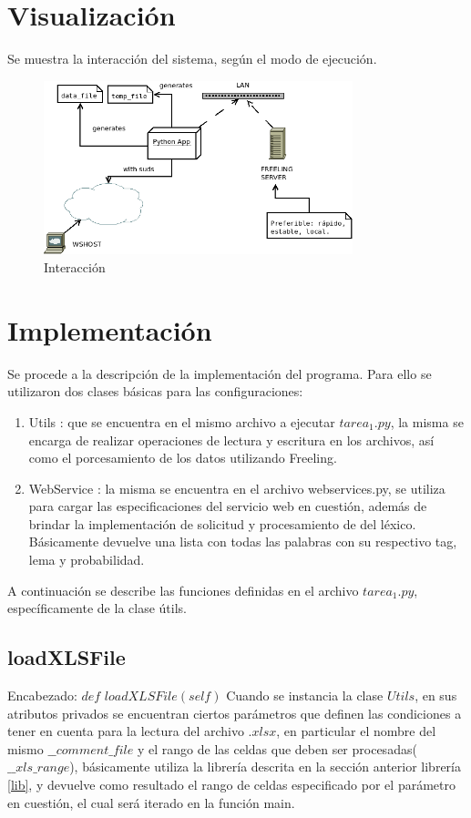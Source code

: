 \documentclass[12pt]{article}
\begin{document}
\section{Visualización}
Se muestra la interacción del sistema, según el modo de ejecución.

\begin{figure}[!h]
  \centering
    \includegraphics[width=0.8\textwidth]{./fig/arq.png}
  \caption{Interacción}
  \label{fig:arq}
\end{figure} 


\section{Implementación} \label{impl}
Se procede a la descripción de la implementación del programa. Para ello se utilizaron dos clases básicas para las configuraciones:
\begin{enumerate}
   \item Utils : que se encuentra en el mismo archivo a ejecutar $tarea_1.py$, la misma se encarga de realizar operaciones de lectura y escritura en los archivos, así como el porcesamiento de los datos utilizando Freeling.
   \item WebService : la misma se encuentra en el archivo webservices.py, se utiliza para cargar las especificaciones del servicio web en cuestión, además de brindar la implementación de solicitud y procesamiento de del léxico. Básicamente devuelve una lista con todas las palabras con su respectivo tag, lema y probabilidad.
 \end{enumerate} 

A continuación se describe las funciones definidas en el archivo $tarea_1.py$, específicamente de la clase útils.


\subsection{loadXLSFile} \label{xlslib}
Encabezado: $def$ $loadXLSFile(self)$
Cuando se instancia la clase $Utils$, en sus atributos privados se encuentran ciertos parámetros que definen las condiciones a tener en cuenta para la lectura del archivo $.xlsx$, en particular el nombre del mismo $\_\_comment\_file$ y el rango de las celdas que deben ser procesadas($\_\_xls\_range$), básicamente utiliza la librería descrita en la sección anterior librería \ref{lib}, y devuelve como resultado el rango de celdas especificado por el parámetro en cuestión, el cual será iterado en la función main.
\end{document}
